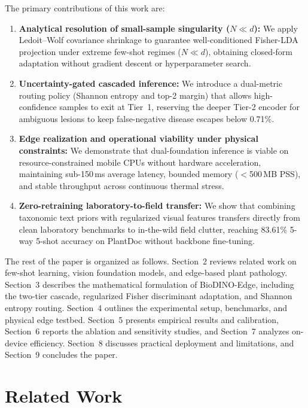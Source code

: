 \documentclass[preprint,12pt]{elsarticle}
\begin{document}
The primary contributions of this work are:
\begin{enumerate}
    \item \textbf{Analytical resolution of small-sample singularity ($N \ll d$):} We apply Ledoit--Wolf covariance shrinkage to guarantee well-conditioned Fisher-LDA projection under extreme few-shot regimes ($N \ll d$), obtaining closed-form adaptation without gradient descent or hyperparameter search.
    \item \textbf{Uncertainty-gated cascaded inference:} We introduce a dual-metric routing policy (Shannon entropy and top-2 margin) that allows high-confidence samples to exit at Tier~1, reserving the deeper Tier-2 encoder for ambiguous lesions to keep false-negative disease escapes below 0.71\%.
    \item \textbf{Edge realization and operational viability under physical constraints:} We demonstrate that dual-foundation inference is viable on resource-constrained mobile CPUs without hardware acceleration, maintaining sub-150\,ms average latency, bounded memory ($<$500\,MB PSS), and stable throughput across continuous thermal stress.
    \item \textbf{Zero-retraining laboratory-to-field transfer:} We show that combining taxonomic text priors with regularized visual features transfers directly from clean laboratory benchmarks to in-the-wild field clutter, reaching 83.61\% 5-way 5-shot accuracy on PlantDoc without backbone fine-tuning.
\end{enumerate}

The rest of the paper is organized as follows. Section~2 reviews related work on few-shot learning, vision foundation models, and edge-based plant pathology. Section~3 describes the mathematical formulation of BioDINO-Edge, including the two-tier cascade, regularized Fisher discriminant adaptation, and Shannon entropy routing. Section~4 outlines the experimental setup, benchmarks, and physical edge testbed. Section~5 presents empirical results and calibration, Section~6 reports the ablation and sensitivity studies, and Section~7 analyzes on-device efficiency. Section~8 discusses practical deployment and limitations, and Section~9 concludes the paper.

\section{Related Work}
\label{sec:related_work}
\end{document}
